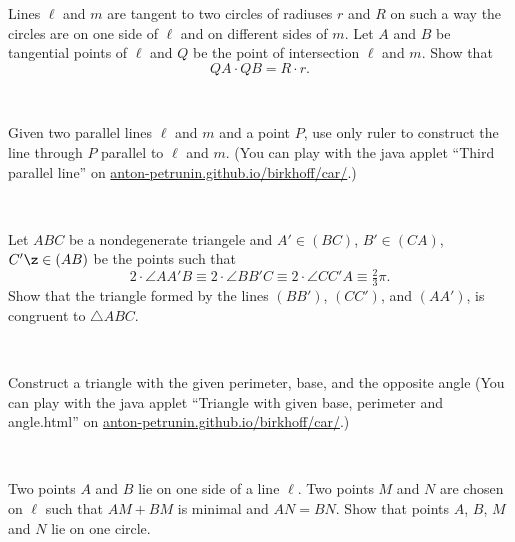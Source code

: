 \documentclass[oneside,a4paper]{article}
\begin{document}
  Lines $\ell$ and $m$ are tangent to two circles of radiuses $r$ and $R$ on such
a way the circles are on one side of $\ell$ and on different sides of $m$. 
Let $A$ and $B$ be
tangential points of $\ell$ and $Q$ be the point of intersection $\ell$ and $m$. 
Show that
$$QA\cdot QB = R\cdot r.$$

\ 

 Given two parallel lines $\ell$ and $m$ and a point $P$, use only ruler to construct the line through $P$ parallel to $\ell$ and $m$.
(You can play with the java applet ``Third parallel line'' on  \href{http://anton-petrunin.github.io/birkhoff/car/}{anton-petrunin.github.io/birkhoff/car/}.)

\ 

 Let $ABC$ be a nondegenerate triangele and $A'\in (BC)$, $B'\in (CA)$, $C'\z\in (AB)$ be the points such that 
\[2\cdot \angle AA'B\equiv 2\cdot \angle BB'C\equiv 2\cdot \angle CC'A\equiv \tfrac23\pi.\]
Show that the triangle formed by the lines $(BB')$, $(CC')$, and $(AA')$, is congruent to  $\triangle ABC$.

\ 

 Construct a triangle with the given perimeter, base, and the opposite angle
(You can play with the java applet ``Triangle with given base, perimeter and angle.html'' on  \href{http://anton-petrunin.github.io/birkhoff/car/}{anton-petrunin.github.io/birkhoff/car/}.)

\ 

 Two points $A$ and $B$ lie on one side of a line $\ell$. 
Two points $M$ and $N$ are chosen on $\ell$ such that $AM + BM$ is minimal and $AN = BN$. 
Show that points $A$, $B$, $M$ and $N$ lie on one circle.
\end{document}
